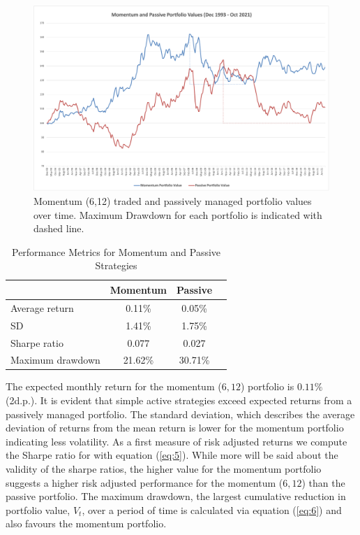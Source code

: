 \documentclass{article}
\begin{document}
\begin{figure}[h!]
    \centering
    \includegraphics[width=0.75\linewidth]{Figure 2.png}
    \captionsetup{font=small, width = 0.75\linewidth}
    \caption{Momentum (6,12) traded and passively managed portfolio values over time. Maximum Drawdown for each portfolio is indicated with dashed line. }
    \label{fig:Portfolio Values}
\end{figure}

\begin{table}[h!]
    \centering
    \captionsetup{font=small,width =0.5\linewidth}
    \caption{\centering Performance Metrics for Momentum and Passive Strategies}
    \label{table:1}
    \begin{tabular}{lccc}
        \toprule
        & \textbf{Momentum} & \textbf{Passive} \\
        \midrule
        Average return & 0.11\% & 0.05\% \\
        SD & 1.41\% & 1.75\% \\
        Sharpe ratio & 0.077 & 0.027 \\
        Maximum drawdown & 21.62\% & 30.71\% \\
        \bottomrule
    \end{tabular}
\end{table}

The expected monthly return for the momentum ($6,12$) portfolio is $0.11\%$ (2d.p.). It is evident that simple active strategies exceed expected returns from a passively managed portfolio. The standard deviation, which describes the average deviation of returns from the mean return is lower for the momentum portfolio indicating less volatility. As a first measure of risk adjusted returns we compute the Sharpe ratio for with equation (\ref{eq:5}). While more will be said about the validity of the sharpe ratios, the higher value for the momentum portfolio suggests a higher risk adjusted performance for the momentum ($6,12$) than the passive portfolio. The maximum drawdown, the largest cumulative reduction in portfolio value, $V_{t}$, over a period of time is calculated via equation (\ref{eq:6}) and also favours the momentum portfolio. 
\end{document}
